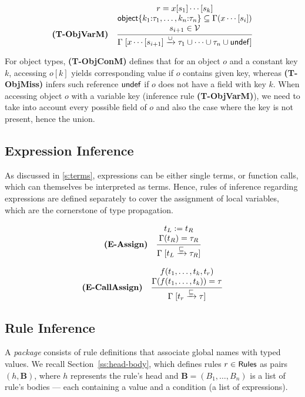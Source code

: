 \vspace{1mm}

\[
\textbf{(T-ObjVarM)}\quad
\inferrule{
  r = x[s_1]\cdots[s_k] \\
  \Obj{k_1{:}\ty_1,\ldots,k_n{:}\ty_n} \subseteq \typof(x\cdots[s_i]) \\
  s_{i+1} \in \Vars
}{
  \unionize{x\cdots[s_{i+1}]}{\ty_1 \cup \cdots \cup \ty_n \cup \Undef}
}
\]

For object types, \textbf{(T-ObjConM)} defines that for an object $o$ and a constant key $k$, accessing $o[k]$ yields corresponding value if $o$ contains given key, whereas \textbf{(T-ObjMiss)} infers such reference $\mathsf{undef}$ if $o$ does not have a field with key $k$.
When accessing object $o$ with a variable key (inference rule \textbf{(T-ObjVarM)}), we need to take into account every possible field of $o$ and also the case where the key is not present, hence the union.

\subsection{Expression Inference}
\label{sec:expr-inference}

As discussed in \ref{s:terms}, expressions can be either single terms, or function calls, which can themselves be interpreted as terms.
Hence, rules of inference regarding expressions are defined separately to cover the assignment of local variables, which are the cornerstone of type propagation.

\[
\textbf{(E-Assign)}\quad
\inferrule{
  t_L \mathrel{:= } t_R \\
  \typof(t_R) = \ty_R
}{
  \refine{t_L}{\ty_R}
}
\]

\[
\textbf{(E-CallAssign)}\quad
\inferrule{
  f(t_1,\ldots,t_k,t_r) \\
  \typof(f(t_1,\ldots,t_k)) = \ty
}{
  \refine{t_r}{\ty}
}
\]

%

\subsection{Rule Inference}
\label{sec:rule-inference}

A \rego \emph{package} consists of rule definitions that associate global names with typed values.
We recall Section~\ref{ss:head-body}, which defines rules $r \in \mathsf{Rules}$ as pairs $(h, \mathbf{B})$, where $h$ represents the rule's head and $\mathbf{B} = (B_1, \ldots, B_n)$ is a list of rule's bodies — each containing a value and a condition (a list of expressions).

